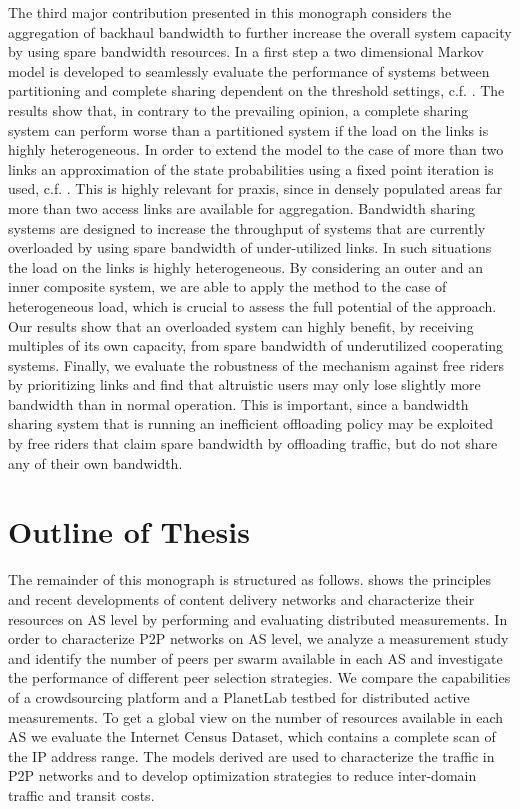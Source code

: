 The third major contribution presented in this monograph considers the aggregation of backhaul bandwidth to further increase the overall system capacity by using spare bandwidth resources.
In a first step a two dimensional Markov model is developed to seamlessly evaluate the performance of systems between partitioning and complete sharing dependent on the threshold settings, c.f. \cite{burger2016phycom}.
The results show that, in contrary to the prevailing opinion, a complete sharing system can perform worse than a partitioned system if the load on the links is highly heterogeneous.
In order to extend the model to the case of more than two links an approximation of the state probabilities using a fixed point iteration is used, c.f. \cite{burger2017im}.
This is highly relevant for praxis, since in densely populated areas far more than two access links are available for aggregation.
Bandwidth sharing systems are designed to increase the throughput of systems that are currently overloaded by using spare bandwidth of under-utilized links.
In such situations the load on the links is highly heterogeneous.
By considering an outer and an inner composite system, we are able to apply the method to the case of heterogeneous load, which is crucial to assess the full potential of the approach.
Our results show that an overloaded system can highly benefit, by receiving multiples of its own capacity, from spare bandwidth of underutilized cooperating systems.
Finally, we evaluate the robustness of the mechanism against free riders by prioritizing links and find that altruistic users may only lose slightly more bandwidth than in normal operation.
This is important, since a bandwidth sharing system that is running an inefficient offloading policy may be exploited by free riders that claim spare bandwidth by offloading traffic, but do not share any of their own bandwidth.


\section{Outline of Thesis}\label{sec:introduction:outline}

The remainder of this monograph is structured as follows.
 shows the principles and recent developments of content delivery networks and characterize their resources on AS level by performing and evaluating distributed measurements.
In order to characterize P2P networks on AS level, we analyze a measurement study and identify the number of peers per swarm available in each AS and investigate the performance of different peer selection strategies.
We compare the capabilities of a crowdsourcing platform and a PlanetLab testbed for distributed active measurements.
To get a global view on the number of resources available in each AS we evaluate the Internet Census Dataset, which contains a complete scan of the IP address range.
The models derived are used to characterize the traffic in P2P networks and to develop optimization strategies to reduce inter-domain traffic and transit costs.

